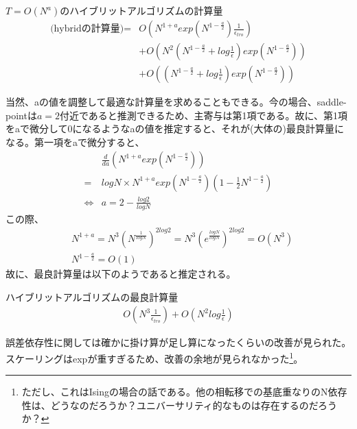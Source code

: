 \documentclass[a4paper,10.5pt]{article}
\numberwithin{equation}{section}
\begin{document}
\begin{enumerate}
\begin{resultbox}{$T=O(N^{a})$のハイブリットアルゴリズムの計算量}
    \begin{align*}
    \text{(hybridの計算量)}=&O(N^{1+a}exp(N^{1-\frac{a}{2}})\frac{1}{\epsilon_{tro}}) \\
    &+ O(N^{2}(N^{1-\frac{a}{2}}+log\frac{1}{\epsilon})exp(N^{1-\frac{a}{2}}))\\
    &+ O((N^{1-\frac{a}{2}}+log\frac{1}{\epsilon})exp(N^{1-\frac{a}{2}}))
\end{align*}
\end{resultbox}
当然、aの値を調整して最適な計算量を求めることもできる。今の場合、saddle-pointは$a=2$付近であると推測できるため、主寄与は第1項である。故に、第1項をaで微分して0になるようなaの値を推定すると、それが(大体の)最良計算量になる。第一項をaで微分すると、
\begin{align*}
    &\frac{d}{da}(N^{1+a}exp(N^{1-\frac{a}{2}}))\\
    =& logN\times N^{1+a}exp(N^{1-\frac{a}{2}})(1-\frac{1}{2}N^{1-\frac{a}{2}})\\
    \iff& a=2-\frac{log2}{logN}
\end{align*}
この際、
\begin{align*}
    &N^{1+a}=N^{3}(N^{\frac{1}{logN}})^{2log2}=N^{3}(e^{\frac{logN}{logN}})^{2log2}=O(N^{3})\\
    &N^{1-\frac{a}{2}}=O(1)
\end{align*}
故に、最良計算量は以下のようであると推定される。
\begin{resultbox}{ハイブリットアルゴリズムの最良計算量}
    \begin{align*}
        O(N^{3}\frac{1}{\epsilon_{tro}})+O(N^{2}log\frac{1}{\epsilon})
    \end{align*}
\end{resultbox}
誤差依存性に関しては確かに掛け算が足し算になったくらいの改善が見られた。スケーリングはexpが重すぎるため、改善の余地が見られなかった\footnote{ただし、これはIsingの場合の話である。他の相転移での基底重なりのN依存性は、どうなのだろうか？ユニバーサリティ的なものは存在するのだろうか？}。


\end{enumerate}
\end{document}
